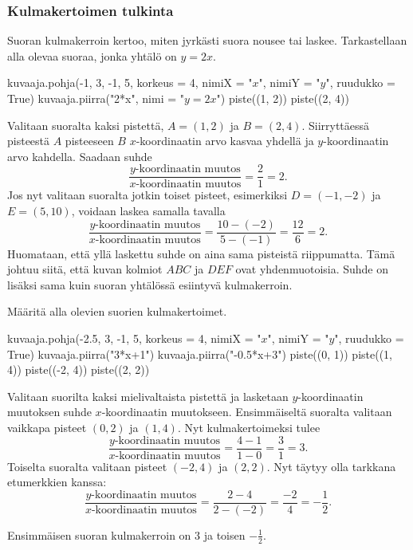 \subsubsection*{Kulmakertoimen tulkinta}

Suoran kulmakerroin kertoo, miten jyrkästi suora nousee tai laskee. Tarkastellaan alla olevaa suoraa, jonka yhtälö on $y=2x$.

\begin{kuva}
    kuvaaja.pohja(-1, 3, -1, 5, korkeus = 4, nimiX = "$x$", nimiY = "$y$", ruudukko = True)
    kuvaaja.piirra("2*x", nimi = "$y=2x$")
    piste((1, 2))
    piste((2, 4))
\end{kuva}


Valitaan suoralta kaksi pistettä,
$A=(1, 2)$ ja $B=(2, 4)$. Siirryttäessä pisteestä $A$ pisteeseen $B$ $x$-koordinaatin arvo kasvaa yhdellä ja $y$-koordinaatin arvo kahdella. Saadaan suhde
\[
\frac{\text{$y$-koordinaatin muutos}}{\text{$x$-koordinaatin muutos}}=\frac{2}{1}=2.
\]
Jos nyt valitaan suoralta jotkin toiset pisteet, esimerkiksi $D=(-1, -2)$ ja $E=(5, 10)$, voidaan laskea samalla tavalla
\[
\frac{\text{$y$-koordinaatin muutos}}{\text{$x$-koordinaatin muutos}}=\frac{10-(-2)}{5-(-1)}=\frac{12}{6}=2.
\]
Huomataan, että yllä laskettu suhde on aina sama pisteistä riippumatta. Tämä johtuu siitä, että kuvan kolmiot $ABC$ ja $DEF$ ovat yhdenmuotoisia.
Suhde on lisäksi sama kuin suoran yhtälössä esiintyvä kulmakerroin.

\begin{esimerkki} Määritä alla olevien suorien kulmakertoimet.


\begin{kuva}
    kuvaaja.pohja(-2.5, 3, -1, 5, korkeus = 4, nimiX = "$x$", nimiY = "$y$", ruudukko = True)
    kuvaaja.piirra("3*x+1")
    kuvaaja.piirra("-0.5*x+3")
    piste((0, 1))
    piste((1, 4))
    piste((-2, 4))
    piste((2, 2))
\end{kuva}

\begin{esimratk} Valitaan suorilta kaksi mielivaltaista pistettä ja lasketaan $y$-koordinaatin muutoksen suhde $x$-koordinaatin muutokseen.
Ensimmäiseltä suoralta valitaan vaikkapa pisteet $(0, 2)$ ja $(1, 4)$. Nyt kulmakertoimeksi tulee
\[
\frac{\text{$y$-koordinaatin muutos}}{\text{$x$-koordinaatin muutos}}=\frac{4-1}{1-0}=\frac{3}{1}=3.
\]
Toiselta suoralta valitaan pisteet $(-2, 4)$ ja $(2, 2)$. Nyt täytyy olla tarkkana etumerkkien kanssa:
\[
\frac{\text{$y$-koordinaatin muutos}}{\text{$x$-koordinaatin muutos}}=\frac{2-4}{2-(-2)}=\frac{-2}{4}=-\frac{1}{2}.
\]
\end{esimratk}

\begin{esimvast}
Ensimmäisen suoran kulmakerroin on $3$ ja toisen $-\frac{1}{2}$.
\end{esimvast}
\end{esimerkki}

